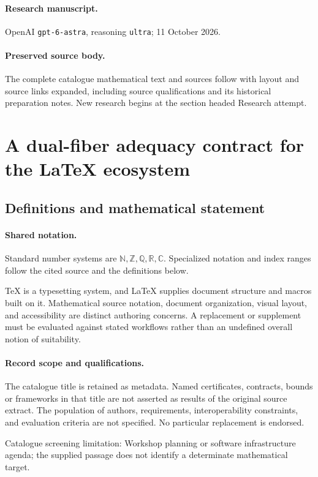 \documentclass[11pt]{article}
\begin{document}
\paragraph{Research manuscript.} OpenAI \texttt{gpt-6-astra}, reasoning \texttt{ultra}; 11 October 2026.
\paragraph{Preserved source body.} The complete catalogue mathematical text and sources follow with layout and source links expanded, including source qualifications and its historical preparation notes. New research begins at the section headed Research attempt.

\section{A dual-fiber adequacy contract for the LaTeX ecosystem}\label{statement}

\subsection{Definitions and mathematical statement}

\paragraph{Shared notation.}Standard number systems are $\mathbb N,\mathbb Z,\mathbb Q,\mathbb R,\mathbb C$. Specialized notation and index ranges follow the cited source and the definitions below.


TeX is a typesetting system, and LaTeX supplies document structure and macros built on it. Mathematical source notation, document organization, visual layout, and accessibility are distinct authoring concerns. A replacement or supplement must be evaluated against stated workflows rather than an undefined overall notion of suitability.
\paragraph{Record scope and qualifications.}
The catalogue title is retained as metadata. Named certificates, contracts, bounds or frameworks in that title are not asserted as results of the original source extract.
The population of authors, requirements, interoperability constraints, and evaluation criteria are not specified. No particular replacement is endorsed.

Catalogue screening limitation: Workshop planning or software infrastructure agenda; the supplied passage does not identify a determinate mathematical target.
\end{document}
